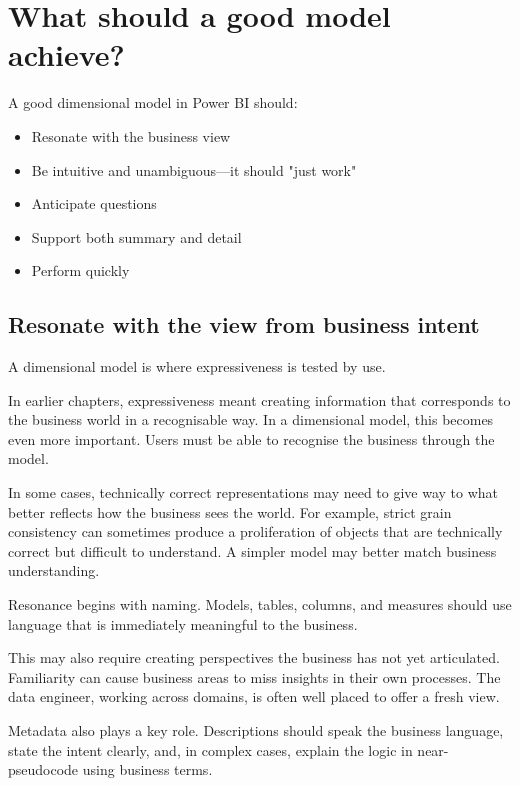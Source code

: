 \documentclass[10pt,openany,10pt]{book}
\providecommand{\tightlist}{%
  \setlength{\itemsep}{0pt}\setlength{\parskip}{0pt}}
\begin{document}
\section{What should a good model
achieve?}\label{what-should-a-good-model-achieve}

A good dimensional model in Power BI should:

\begin{itemize}
\tightlist
\item
  Resonate with the business view
\item
  Be intuitive and unambiguous---it should "just work"
\item
  Anticipate questions
\item
  Support both summary and detail
\item
  Perform quickly
\end{itemize}

\subsection{Resonate with the view from business
intent}\label{resonate-with-the-view-from-business-intent}

A dimensional model is where expressiveness is tested by use.

In earlier chapters, expressiveness meant creating information that
corresponds to the business world in a recognisable way. In a
dimensional model, this becomes even more important. Users must be able
to recognise the business through the model.

In some cases, technically correct representations may need to give way
to what better reflects how the business sees the world. For example,
strict grain consistency can sometimes produce a proliferation of
objects that are technically correct but difficult to understand. A
simpler model may better match business understanding.

Resonance begins with naming. Models, tables, columns, and measures
should use language that is immediately meaningful to the business.

This may also require creating perspectives the business has not yet
articulated. Familiarity can cause business areas to miss insights in
their own processes. The data engineer, working across domains, is often
well placed to offer a fresh view.

Metadata also plays a key role. Descriptions should speak the business
language, state the intent clearly, and, in complex cases, explain the
logic in near-pseudocode using business terms.
\end{document}
